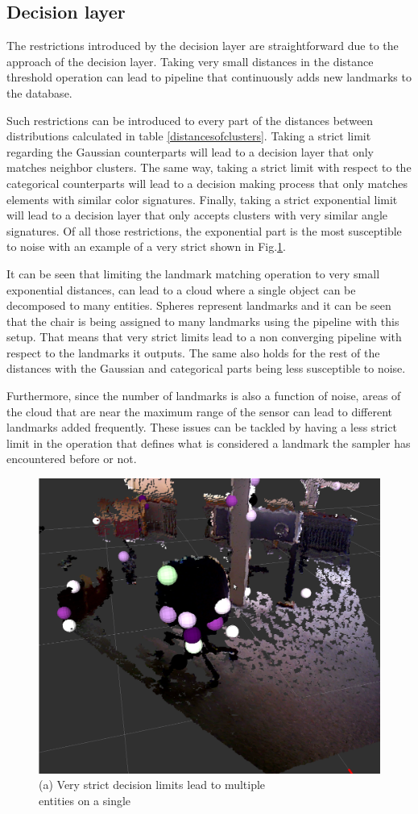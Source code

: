 \documentclass[twoside,hidelinks]{article}
\begin{document}
\subsection{Decision layer}

The restrictions introduced by the decision layer are straightforward due to the approach of the decision layer. Taking very small distances in the distance threshold operation can lead to pipeline that continuously adds new landmarks to the database. 

Such restrictions can be introduced to every part of the distances between distributions calculated in table \ref{distancesofclusters}. Taking a strict limit regarding the 
Gaussian counterparts will lead to a decision layer that only matches neighbor clusters. The same way, taking a strict limit with respect to the categorical counterparts will lead to a decision making process that only matches elements with similar color signatures. Finally, taking a strict exponential limit will lead to a decision layer that only accepts clusters with very similar angle signatures. Of all those restrictions, the exponential part is the most susceptible to noise with an example of a very strict shown in Fig.\ref{pip:expo}.

It can be seen that limiting the landmark matching operation to very small exponential distances, can lead to a cloud where a single object can be decomposed to many entities. Spheres represent landmarks and it can be seen that the chair is being assigned to many landmarks using the pipeline with this setup. That means that very strict limits lead to a non converging pipeline with respect to the landmarks it outputs. The same also holds for the rest of the distances with the Gaussian and categorical parts being less susceptible to noise. 

Furthermore, since the number of landmarks is also a function of noise, areas of the cloud that are near the maximum range of the sensor can lead to different landmarks added frequently. These issues can be tackled by having a less strict limit in the operation that defines what is considered a landmark the sampler has encountered before or not.


\begin{figure}[!ht]
        \centering
	    \includegraphics[width=.5\textwidth]{monsterchair} \\
	  (a) Very strict decision limits lead to multiple \\
	   entities on a single \\[6pt]
	  \label{pip:expo}
    \end{figure}
\end{document}
